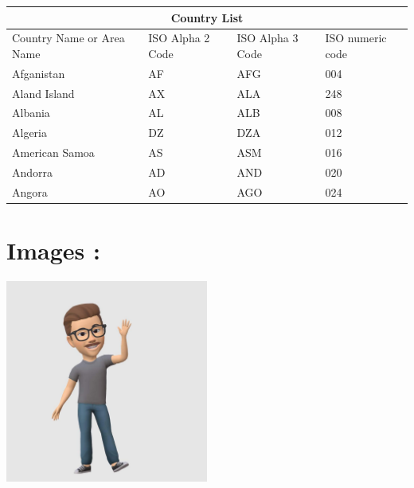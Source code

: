 \documentclass[12pt]{article}
\begin{document}
\begin{tabular}{|llll|}
\hline
\multicolumn{4}{|c|}{\textbf{Country List}}                                                                                                        \\ \hline
\multicolumn{1}{|l|}{Country Name or Area Name} & \multicolumn{1}{l|}{ISO Alpha 2 Code} & \multicolumn{1}{l|}{ISO Alpha 3 Code} & ISO numeric code \\ \hline
\multicolumn{1}{|l|}{Afganistan}                & \multicolumn{1}{l|}{AF}               & \multicolumn{1}{l|}{AFG}              & 004              \\ \hline
\multicolumn{1}{|l|}{Aland Island}              & \multicolumn{1}{l|}{AX}               & \multicolumn{1}{l|}{ALA}              & 248              \\ \hline
\multicolumn{1}{|l|}{Albania}                   & \multicolumn{1}{l|}{AL}               & \multicolumn{1}{l|}{ALB}              & 008              \\ \hline
\multicolumn{1}{|l|}{Algeria}                   & \multicolumn{1}{l|}{DZ}               & \multicolumn{1}{l|}{DZA}              & 012              \\ \hline
\multicolumn{1}{|l|}{American Samoa}            & \multicolumn{1}{l|}{AS}               & \multicolumn{1}{l|}{ASM}              & 016              \\ \hline
\multicolumn{1}{|l|}{Andorra}                   & \multicolumn{1}{l|}{AD}               & \multicolumn{1}{l|}{AND}              & 020              \\ \hline
\multicolumn{1}{|l|}{Angora}                    & \multicolumn{1}{l|}{AO}               & \multicolumn{1}{l|}{AGO}              & 024              \\ \hline
\end{tabular}

\section*{ Images :}
\begin{center}
\includegraphics[width=0.5\textwidth]{img.jpg}
    
\end{center}
\end{document}
